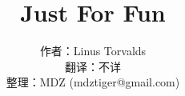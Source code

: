 \documentclass[10pt,a4paper]{book}
\title{\Huge Just For Fun}
\author{作者：Linus Torvalds\\
翻译：不详\\
整理：MDZ (mdztiger@gmail.com)}
\begin{document}
\maketitle
\newpage



\newpage
\tableofcontents
\setlength{\baselineskip}{13pt} %
\renewcommand{\arraystretch}{1.5}


\newpage


\newpage


\newpage


\newpage


\end{document}
